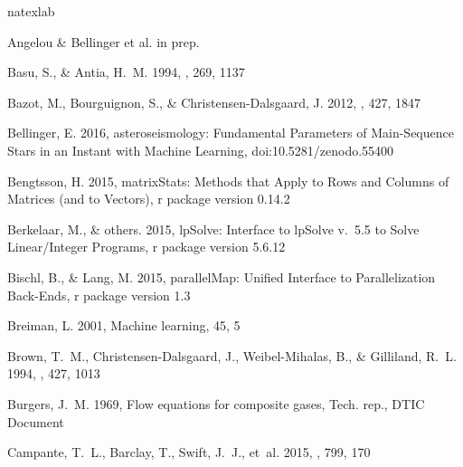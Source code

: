 \documentclass[manuscript,linenumbers]{aastex6}
\begin{document}
%
%
\begin{thebibliography}{}
\expandafter\ifx\csname natexlab\endcsname\relax\def\natexlab#1{#1}\fi

{Angelou \& Bellinger et al.} in prep. 

{Basu}, S., \& {Antia}, H.~M. 1994, \mnras, 269, 1137

{Bazot}, M., {Bourguignon}, S., \& {Christensen-Dalsgaard}, J. 2012, \mnras,
  427, 1847

Bellinger, E. 2016, {asteroseismology: Fundamental Parameters of Main-Sequence
  Stars in an Instant with Machine Learning}, doi:10.5281/zenodo.55400

Bengtsson, H. 2015, matrixStats: Methods that Apply to Rows and Columns of
  Matrices (and to Vectors), r package version 0.14.2

Berkelaar, M., \& {others}. 2015, lpSolve: Interface to lpSolve v.~5.5 to Solve
  Linear/Integer Programs, r package version 5.6.12

Bischl, B., \& Lang, M. 2015, parallelMap: Unified Interface to Parallelization
  Back-Ends, r package version 1.3

Breiman, L. 2001, Machine learning, 45, 5

{Brown}, T.~M., {Christensen-Dalsgaard}, J., {Weibel-Mihalas}, B., \&
  {Gilliland}, R.~L. 1994, \apj, 427, 1013

Burgers, J.~M. 1969, Flow equations for composite gases, Tech. rep., DTIC
  Document

{Campante}, T.~L., {Barclay}, T., {Swift}, J.~J., {et~al.} 2015, \apj, 799, 170


\end{thebibliography}
\end{document}
